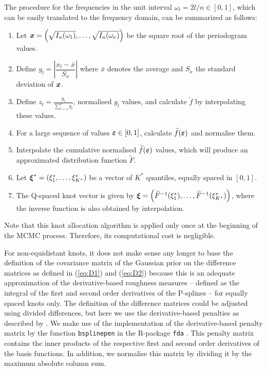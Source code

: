 \documentclass[twocolumn,final]{svjour3}
\newcommand{\bm}[1]{\mbox{\boldmath $#1$}}
\newcommand{\pmr}{ \color{red}}
\begin{document}
{\pmr
The procedure for the frequencies in the unit interval $\omega_l = 2 l/n  \in[0,1]$, which can be easily translated to the frequency domain, can be summarized as follows:	
\begin{enumerate}
	\item Let $\bm{x} = \left (\sqrt{I_n(\omega_1)}, \dots, \sqrt{I_n(\omega_{\nu})} \right)$ be the square root of the periodogram values.
	\item Define $y_l = \left|\dfrac{x_l - \bar{x}}{S_x} \right|$ where $\bar{x}$ denotes the average and $S_x$ the standard deviation of ${\bm x}$.
	\item Define $z_l = \frac{y_l}{\sum_{l=1}^{\nu} y_l}$, normalised $y_l$ values, and calculate $\widetilde{f}$ by interpolating these values.
	\item For a large sequence of values $\bm{\varepsilon}\in[0,1]$, calculate $\widetilde{f}(\bm{\varepsilon})$ and normalise them.
	\item Interpolate the cumulative normalised $\widetilde{f}(\bm{\varepsilon})$ values, which will produce an approximated distribution function $\widetilde{F}$.	
	\item Let $\bm{\xi}^* = \left(\xi_1^*,\dots,\xi_{K^*}^* \right)$ be a vector of $K^*$ quantiles, equally spaced in $[0,1]$.
	\item The Q-spaced knot vector is given by $\bm{\xi} = \left(\widetilde{F}^{-1}(\xi^*_1),\dots, \widetilde{F}^{-1}(\xi^*_{K^*}) \right)$, where the inverse function is also obtained by interpolation.	
\end{enumerate}

Note that this knot allocation algorithm is applied only once at the beginning of the MCMC process.  Therefore, its computational cost is negligible.

}

For non-equidistant knots, it does not make sense any longer to base the definition of the covariance matrix of the Gaussian prior  on the  difference matrices as defined in (\ref{eq:D1}) and (\ref{eq:D2}) because this is an adequate approximation of the derivative-based roughness measures -- defined as the integral of the first and second order derivatives of the P-splines -- 
for equally spaced knots only. The definition of the difference matrices could be adjusted using divided differences, but here we use the derivative-based penalties as described by \cite{WoodSimon2017Pwdb}. We make use of the implementation of the derivative-based penalty matrix  by the function {\tt bsplinepen} in the R-package {\tt fda} \citep{fda}. This penalty matrix contains the inner products of the respective first and second order derivatives of the basis functions. In addition, we normalise this matrix by dividing it by the maximum absolute column sum.
\end{document}
